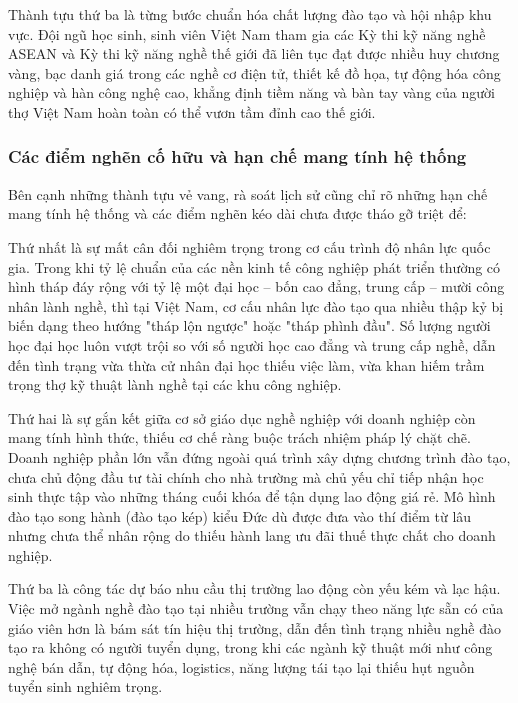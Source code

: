 Thành tựu thứ ba là từng bước chuẩn hóa chất lượng đào tạo và hội nhập khu vực. Đội ngũ học sinh, sinh viên Việt Nam tham gia các Kỳ thi kỹ năng nghề ASEAN và Kỳ thi kỹ năng nghề thế giới đã liên tục đạt được nhiều huy chương vàng, bạc danh giá trong các nghề cơ điện tử, thiết kế đồ họa, tự động hóa công nghiệp và hàn công nghệ cao, khẳng định tiềm năng và bàn tay vàng của người thợ Việt Nam hoàn toàn có thể vươn tầm đỉnh cao thế giới.

\subsubsection{Các điểm nghẽn cố hữu và hạn chế mang tính hệ thống}

Bên cạnh những thành tựu vẻ vang, rà soát lịch sử cũng chỉ rõ những hạn chế mang tính hệ thống và các điểm nghẽn kéo dài chưa được tháo gỡ triệt để:

Thứ nhất là sự mất cân đối nghiêm trọng trong cơ cấu trình độ nhân lực quốc gia. Trong khi tỷ lệ chuẩn của các nền kinh tế công nghiệp phát triển thường có hình tháp đáy rộng với tỷ lệ một đại học -- bốn cao đẳng, trung cấp -- mười công nhân lành nghề, thì tại Việt Nam, cơ cấu nhân lực đào tạo qua nhiều thập kỷ bị biến dạng theo hướng "tháp lộn ngược" hoặc "tháp phình đầu". Số lượng người học đại học luôn vượt trội so với số người học cao đẳng và trung cấp nghề, dẫn đến tình trạng vừa thừa cử nhân đại học thiếu việc làm, vừa khan hiếm trầm trọng thợ kỹ thuật lành nghề tại các khu công nghiệp.

Thứ hai là sự gắn kết giữa cơ sở giáo dục nghề nghiệp với doanh nghiệp còn mang tính hình thức, thiếu cơ chế ràng buộc trách nhiệm pháp lý chặt chẽ. Doanh nghiệp phần lớn vẫn đứng ngoài quá trình xây dựng chương trình đào tạo, chưa chủ động đầu tư tài chính cho nhà trường mà chủ yếu chỉ tiếp nhận học sinh thực tập vào những tháng cuối khóa để tận dụng lao động giá rẻ. Mô hình đào tạo song hành (đào tạo kép) kiểu Đức dù được đưa vào thí điểm từ lâu nhưng chưa thể nhân rộng do thiếu hành lang ưu đãi thuế thực chất cho doanh nghiệp.

Thứ ba là công tác dự báo nhu cầu thị trường lao động còn yếu kém và lạc hậu. Việc mở ngành nghề đào tạo tại nhiều trường vẫn chạy theo năng lực sẵn có của giáo viên hơn là bám sát tín hiệu thị trường, dẫn đến tình trạng nhiều nghề đào tạo ra không có người tuyển dụng, trong khi các ngành kỹ thuật mới như công nghệ bán dẫn, tự động hóa, logistics, năng lượng tái tạo lại thiếu hụt nguồn tuyển sinh nghiêm trọng.

